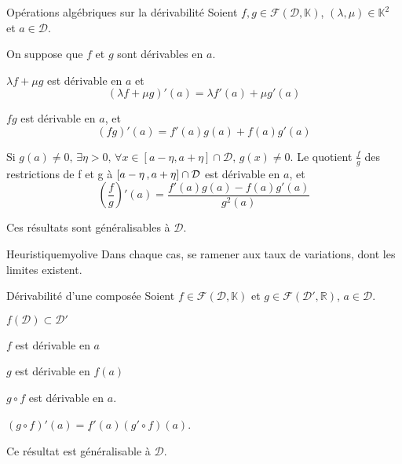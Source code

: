     \begin{prop}{Opérations algébriques sur la dérivabilité}{}
        Soient $f,g \in \mathcal{F}(\mathcal{D},\mathbb{K})$, $(\lambda,\mu) \in \mathbb{K}^2$ et $a \in \mathcal{D}$. 

        On suppose que $f$ et $g$ sont dérivables en $a$.

        \begin{alors}
            \item $\lambda f + \mu g$ est dérivable en $a$ et 
            \[ (\lambda f + \mu g)'(a) = \lambda f'(a) + \mu g'(a) \]
            \item $fg$ est dérivable en $a$, et 
            \[ (fg)'(a) = f'(a)g(a) + f(a)g'(a) \]
            \item Si $g(a) \neq 0, \, \exists \eta > 0, \, \forall x \in [a-\eta,a+\eta] \cap \mathcal{D}, \, g(x) \neq 0$. Le quotient $\frac{f}{g}$ des restrictions de f et g à $\left[ a-\eta \, , a+\eta \right] \cap \mathcal{D}$ est dérivable en $a$, et 
            \[ \left(\frac{f}{g}\right)'(a) = \frac{f'(a)g(a) - f(a)g'(a)}{g^2(a)} \]
        \end{alors}
        Ces résultats sont généralisables à $\mathcal{D}$.
    \end{prop}

    \begin{demo}{Heuristique}{myolive}
        Dans chaque cas, se ramener aux taux de variations, dont les limites existent.
    \end{demo}

    \begin{prop}{Dérivabilité d’une composée}{}
        Soient $f \in \mathcal{F}(\mathcal{D}, \mathbb{K})$ et $g \in \mathcal{F}(\mathcal{D}', \mathbb{R})$, $a \in \mathcal{D}$.

        \begin{suppose}
            \item $f(\mathcal{D}) \subset \mathcal{D}'$
            \item $f$ est dérivable en $a$
            \item $g$ est dérivable en $f(a)$
        \end{suppose}
        \begin{alors}
            \item $g \circ f$ est dérivable en $a$.
            \item $(g \circ f)'(a) = f̦'(a)(g' \circ f)(a)$.
        \end{alors}
        Ce résultat est généralisable à $\mathcal{D}$.
    \end{prop}

